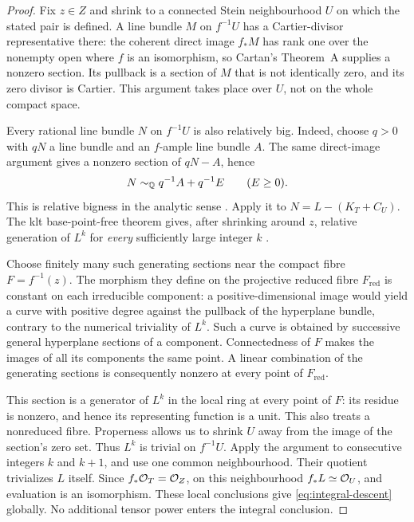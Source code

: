 \begin{proof}
Fix $z\in Z$ and shrink to a connected Stein neighbourhood $U$ on which
the stated pair is defined.  A line bundle $M$ on $f^{-1}U$ has a
Cartier-divisor representative there: the coherent direct image $f_*M$
has rank one over the nonempty open where $f$ is an isomorphism, so
Cartan's Theorem~A supplies a nonzero section.  Its pullback is a section
of $M$ that is not identically zero, and its zero divisor is Cartier.
This argument takes place over $U$, not on the whole compact space.

Every rational line bundle $N$ on $f^{-1}U$ is also relatively big.
Indeed, choose $q>0$ with $qN$ a line bundle and an $f$-ample line bundle
$A$.  The same direct-image argument gives a nonzero section of
$qN-A$, hence
\[
 N\sim_{\mathbb Q} q^{-1}A+q^{-1}E\qquad(E\geq0).
\]
This is relative bigness in the analytic sense
\cite[Definition~2.46]{Fujino2022}.  Apply it to
$N=L-(K_T+C_U)$.  The klt base-point-free theorem gives, after shrinking
around $z$, relative generation of $L^k$ for \emph{every} sufficiently
large integer $k$ \cite[Theorem~6.2 and Remark~6.3]{Fujino2022}.

Choose finitely many such generating sections near the compact fibre
$F=f^{-1}(z)$.  The morphism they define on the projective reduced fibre
$F_{\mathrm{red}}$ is constant on each irreducible component: a
positive-dimensional image would yield a curve with positive degree
against the pullback of the hyperplane bundle, contrary to the
numerical triviality of $L^k$.  Such a curve is obtained by successive
general hyperplane sections of a component.  Connectedness of $F$ makes
the images of all its components the same point.  A linear combination
of the generating sections is consequently nonzero at every point of
$F_{\mathrm{red}}$.

This section is a generator of $L^k$ in the local ring at every point of
$F$: its residue is nonzero, and hence its representing function is a
unit.  This also treats a nonreduced fibre.  Properness allows us to
shrink $U$ away from the image of the section's zero set.  Thus $L^k$ is
trivial on $f^{-1}U$.  Apply the argument to consecutive integers $k$ and
$k+1$, and use one common neighbourhood.  Their quotient trivializes
$L$ itself.  Since $f_*\mathcal O_T=\mathcal O_Z$, on this neighbourhood $f_*L\simeq
\mathcal O_U$, and evaluation is an isomorphism.  These local conclusions give
\eqref{eq:integral-descent} globally.  No additional tensor power enters
the integral conclusion.
\end{proof}

